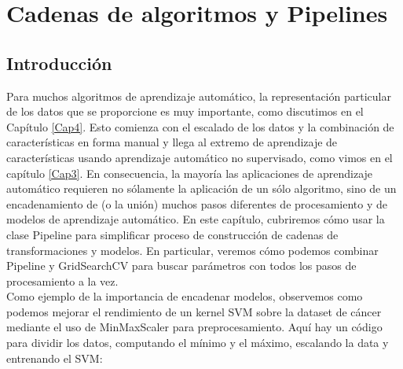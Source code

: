 

	
	
	
	
	\chapter{Cadenas de algoritmos y Pipelines}\label{Cap6}
	
     \section{Introducción}
     
	Para muchos algoritmos de aprendizaje automático, la representación particular de los datos 
	que se proporcione es muy importante, como discutimos en el Capítulo \ref{Cap4}.  Esto comienza con el escalado de los datos y la combinación de características en forma manual  y  llega al extremo de aprendizaje de características  usando aprendizaje automático no supervisado, como vimos en el capítulo \ref{Cap3}.    En consecuencia, la mayoría las aplicaciones de aprendizaje automático requieren
	no sólamente la aplicación de un sólo algoritmo, sino de un encadenamiento de (o la unión)  muchos pasos diferentes de procesamiento y de modelos de aprendizaje automático.  En este capítulo, cubriremos cómo usar la clase {\ttfamily  Pipeline}  para simplificar proceso de construcción de cadenas de transformaciones y modelos. En particular, veremos cómo podemos combinar {\ttfamily Pipeline} y   {\ttfamily GridSearchCV} para buscar parámetros  con  todos los pasos de procesamiento a la vez.\\
	
	
	Como ejemplo de la importancia de encadenar modelos, observemos  como podemos 
	mejorar el rendimiento de un kernel SVM  sobre la dataset  de cáncer mediante el uso de {\ttfamily MinMaxScaler}  para preprocesamiento.   Aquí hay un código para dividir los datos, computando el mínimo y el  máximo, escalando la data y entrenando el SVM:
	
